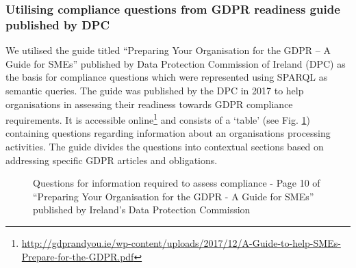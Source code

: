 \subsubsection{Utilising compliance questions from GDPR readiness guide published by DPC}
We utilised the guide titled ``Preparing Your Organisation for the GDPR – A Guide for SMEs'' published by Data Protection Commission of Ireland (DPC) as the basis for compliance questions which were represented using SPARQL as semantic queries.
The guide was published by the DPC in 2017 to help organisations in assessing their readiness towards GDPR compliance requirements.
It is accessible online\footnote{\url{http://gdprandyou.ie/wp-content/uploads/2017/12/A-Guide-to-help-SMEs-Prepare-for-the-GDPR.pdf}} and consists of a `table' (see Fig. \ref{fig:sparql:guide}) containing questions regarding information about an organisations processing activities.
The guide divides the questions into contextual sections based on addressing specific GDPR articles and obligations.
\begin{figure}[htbp]
\centering
{}
\caption{Questions for information required to assess compliance - Page 10 of ``Preparing Your Organisation for the GDPR - A Guide for SMEs'' published by Ireland's Data Protection Commission}
\label{fig:sparql:guide}
\end{figure}

